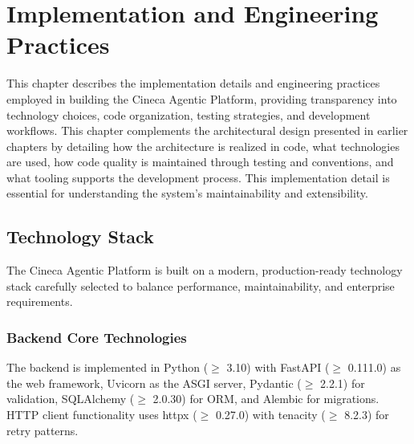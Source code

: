 \documentclass[a4paper,twoside]{sapthesis}
\begin{document}
\chapter{Implementation and Engineering Practices}
\label{ch:implementation}


This chapter describes the implementation details and engineering practices employed in building the Cineca Agentic Platform, providing transparency into technology choices, code organization, testing strategies, and development workflows. This chapter complements the architectural design presented in earlier chapters by detailing how the architecture is realized in code, what technologies are used, how code quality is maintained through testing and conventions, and what tooling supports the development process. This implementation detail is essential for understanding the system's maintainability and extensibility.

\section{Technology Stack}
\label{sec:tech-stack}

The Cineca Agentic Platform is built on a modern, production-ready technology stack carefully selected to balance performance, maintainability, and enterprise requirements.

\subsection{Backend Core Technologies}

The backend is implemented in Python ($\geq$ 3.10) with FastAPI ($\geq$ 0.111.0) as the web framework, Uvicorn as the ASGI server, Pydantic ($\geq$ 2.2.1) for validation, SQLAlchemy ($\geq$ 2.0.30) for ORM, and Alembic for migrations. HTTP client functionality uses httpx ($\geq$ 0.27.0) with tenacity ($\geq$ 8.2.3) for retry patterns.
\end{document}
